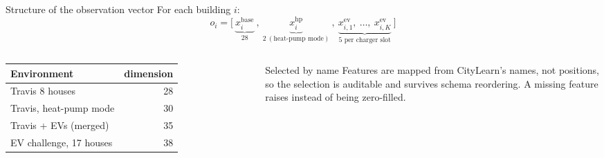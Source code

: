 \documentclass[aspectratio=169,10pt]{beamer}
\begin{document}
\begin{frame}{Structure of the observation vector}
For each building $i$:
\[
o_i = \Big[\ \underbrace{x^{\text{base}}_i}_{28}\ ,\ \underbrace{x^{\text{hp}}_i}_{2\ (\text{heat-pump mode})}\ ,\ \underbrace{x^{\text{ev}}_{i,1},\ \dots,\ x^{\text{ev}}_{i,K}}_{5 \text{ per charger slot}}\ \Big]
\]
\begin{columns}[T]
\small
\begin{tabular}{@{}lr@{}}
\toprule
Environment & dimension \\
\midrule
Travis 8 houses & 28 \\
Travis, heat-pump mode & 30 \\
Travis + EVs (merged) & 35 \\
EV challenge, 17 houses & 38 \\
\bottomrule
\end{tabular}
\begin{block}{Selected by name}
Features are mapped from CityLearn's names, not positions, so the selection is auditable and survives schema reordering. A missing feature raises instead of being zero-filled.
\end{block}
\end{columns}
\end{frame}
\end{document}

